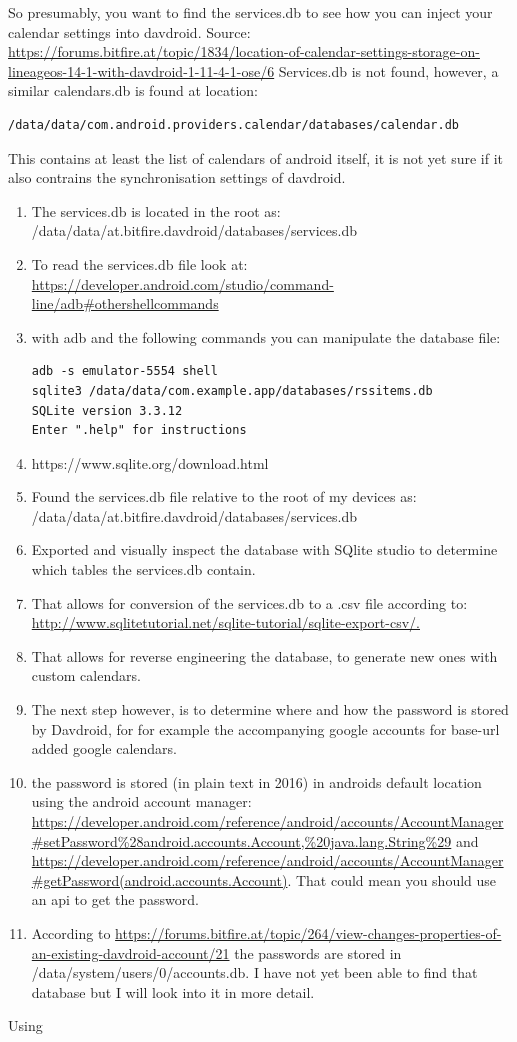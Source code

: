  So presumably, you want to find the services.db to see how you can inject your calendar settings into davdroid.
Source: \url{https://forums.bitfire.at/topic/1834/location-of-calendar-settings-storage-on-lineageos-14-1-with-davdroid-1-11-4-1-ose/6}
Services.db is not found, however, a similar calendars.db is found at location:
\begin{verbatim}
/data/data/com.android.providers.calendar/databases/calendar.db
\end{verbatim}
This contains at least the list of calendars of android itself, it is not yet sure if it also contrains the synchronisation settings of davdroid.



\begin{enumerate}
    \item The services.db is located in the root as: /data/data/at.bitfire.davdroid/databases/services.db
    \item To read the services.db file look at: \url{https://developer.android.com/studio/command-line/adb#othershellcommands}
    \item with adb and the following commands you can manipulate the database file:
\begin{verbatim}
adb -s emulator-5554 shell
sqlite3 /data/data/com.example.app/databases/rssitems.db
SQLite version 3.3.12
Enter ".help" for instructions
\end{verbatim}    
\item 

https://www.sqlite.org/download.html

\item Found the services.db file relative to the root of my devices as: /data/data/at.bitfire.davdroid/databases/services.db
\item Exported and visually inspect the database with SQlite studio to determine which tables the services.db contain.
\item That allows for conversion of the services.db to a .csv file according to: \url{http://www.sqlitetutorial.net/sqlite-tutorial/sqlite-export-csv/.}
\item That allows for reverse engineering the database, to generate new ones with custom calendars.
\item The next step however, is to determine where and how the password is stored by Davdroid, for for example the accompanying google accounts for base-url added google calendars.
\item the password is stored (in plain text in 2016) in androids default location using the android account manager: \url{https://developer.android.com/reference/android/accounts/AccountManager#setPassword%28android.accounts.Account,%20java.lang.String%29} and \url{https://developer.android.com/reference/android/accounts/AccountManager#getPassword(android.accounts.Account)}. That could mean you should use an api to get the password. 
\item According to \url{https://forums.bitfire.at/topic/264/view-changes-properties-of-an-existing-davdroid-account/21} the passwords are stored in /data/system/users/0/accounts.db. I have not yet been able to find that database but I will look into it in more detail.
\end{enumerate}
\noindent Using 